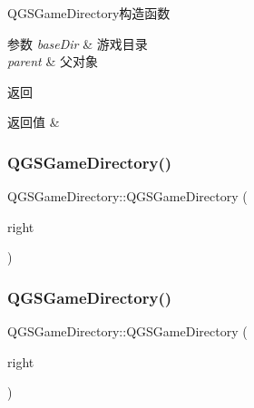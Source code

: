 Q\+G\+S\+Game\+Directory构造函数 


\begin{DoxyParams}{参数}
{\em base\+Dir} & 游戏目录\\
\hline
{\em parent} & 父对象\\
\hline
\end{DoxyParams}
\begin{DoxyReturn}{返回}

\end{DoxyReturn}

\begin{DoxyRetVals}{返回值}
{\em } & \\
\hline
\end{DoxyRetVals}
\mbox{\label{class_q_g_s_game_directory_ad5ccdce95330c099fce0b05c94aae5b8}} 
\subsubsection{\texorpdfstring{Q\+G\+S\+Game\+Directory()}{QGSGameDirectory()}\hspace{0.1cm}{\footnotesize\ttfamily [3/4]}}
{\footnotesize\ttfamily Q\+G\+S\+Game\+Directory\+::\+Q\+G\+S\+Game\+Directory (\begin{DoxyParamCaption}\item[{const \mbox{\hyperlink{class_q_g_s_game_directory}{Q\+G\+S\+Game\+Directory}} \&}]{right }\end{DoxyParamCaption})\hspace{0.3cm}{\ttfamily [default]}}

\mbox{\label{class_q_g_s_game_directory_a4d1c6a621c2de25df717765f3e2ac4bc}} 
\subsubsection{\texorpdfstring{Q\+G\+S\+Game\+Directory()}{QGSGameDirectory()}\hspace{0.1cm}{\footnotesize\ttfamily [4/4]}}
{\footnotesize\ttfamily Q\+G\+S\+Game\+Directory\+::\+Q\+G\+S\+Game\+Directory (\begin{DoxyParamCaption}\item[{\mbox{\hyperlink{class_q_g_s_game_directory}{Q\+G\+S\+Game\+Directory}} \&\&}]{right }\end{DoxyParamCaption})\hspace{0.3cm}{\ttfamily [default]}}

